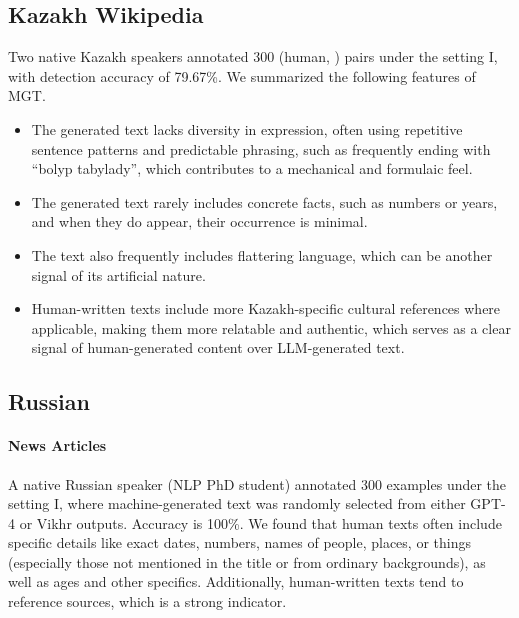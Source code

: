 \subsection{Kazakh Wikipedia}
Two native Kazakh speakers annotated 300 (human, \gptfouro) pairs under the setting I, with detection accuracy of 79.67\%.
We summarized the following features of MGT.
\begin{itemize}
    \item The generated text lacks diversity in expression, often using repetitive sentence patterns and predictable phrasing, such as frequently ending with ``bolyp tabylady'', which contributes to a mechanical and formulaic feel.
    \item The generated text rarely includes concrete facts, such as numbers or years, and when they do appear, their occurrence is minimal.
    \item The text also frequently includes flattering language, which can be another signal of its artificial nature.
    \item Human-written texts include more Kazakh-specific cultural references where applicable, making them more relatable and authentic, which serves as a clear signal of human-generated content over LLM-generated text.
\end{itemize}



\subsection{Russian}
\paragraph{News Articles}
A native Russian speaker (NLP PhD student) annotated 300 examples under the setting I, where machine-generated text was randomly selected from either GPT-4 or Vikhr outputs. Accuracy is 100\%. 
We found that human texts often include specific details like exact dates, numbers, names of people, places, or things (especially those not mentioned in the title or from ordinary backgrounds), as well as ages and other specifics. Additionally, human-written texts tend to reference sources, which is a strong indicator.

